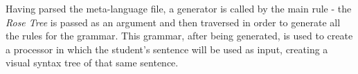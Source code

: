 Having parsed the meta-language file, a generator is called by the main rule - the \emph{Rose Tree} is passed as an argument and then traversed in order to generate all the rules for the grammar. This grammar, after being generated, is used to create a processor in which the student's sentence will be used as input, creating a visual syntax tree of that same sentence.
